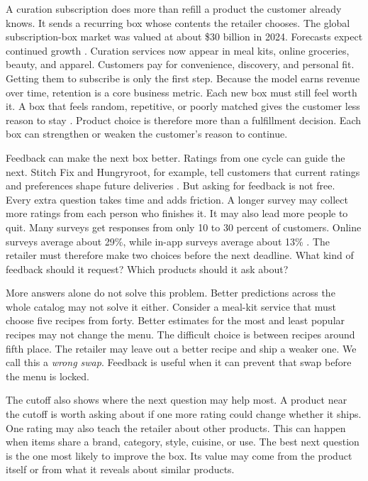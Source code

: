 \documentclass[11pt]{article}
\theoremstyle{definition}
\theoremstyle{remark}
\newcommand{\1}{\mathbf{1}}
\begin{document}
A curation subscription does more than refill a product the customer
already knows. It sends a recurring box whose contents the retailer
chooses. The global subscription-box market was valued at about \$30
billion in 2024. Forecasts expect continued growth
\citep{ResearchAndMarkets2025}.
Curation services now appear in meal kits, online groceries, beauty, and
apparel. Customers pay for convenience, discovery, and personal fit.
Getting them to subscribe is only the first step. Because the model earns
revenue over time, retention is a core business metric. Each new box must
still feel worth it. A box that feels random, repetitive, or poorly
matched gives the customer less reason to stay \citep{ChenEtAl2018}.
Product choice is therefore more than a fulfillment decision. Each box
can strengthen or weaken the customer's reason to continue.

Feedback can make the next box better. Ratings from one cycle can guide
the next. Stitch Fix and Hungryroot, for example, tell customers that
current ratings and preferences shape future deliveries
\citep{StitchFixBestFix2025,HungryrootPersonalized2025,HungryrootPreferences2025}.
But asking for feedback is not free. Every extra question takes time and
adds friction. A longer survey may collect more ratings from each person
who finishes it. It may also lead more people to quit. Many surveys get
responses from only 10 to 30 percent of customers. Online surveys average
about 29\%, while in-app surveys average about 13\% \citep{Malnik2025}.
The retailer must therefore make two choices before the next deadline.
What kind of feedback should it request? Which products should it ask
about?

More answers alone do not solve this problem. Better predictions across
the whole catalog may not solve it either. Consider a meal-kit service
that must choose five recipes from forty. Better estimates for the most
and least popular recipes may not change the menu. The difficult choice
is between recipes around fifth place. The retailer may leave out a
better recipe and ship a weaker one. We call this a \emph{wrong swap}.
Feedback is useful when it can prevent that swap before the menu is
locked.

The cutoff also shows where the next question may help most. A product
near the cutoff is worth asking about if one more rating could change
whether it ships. One rating may also teach the retailer about other
products. This can happen when items share a brand, category, style,
cuisine, or use. The best next question is the one most likely to improve
the box. Its value may come from the product itself or from what it
reveals about similar products.
\end{document}
